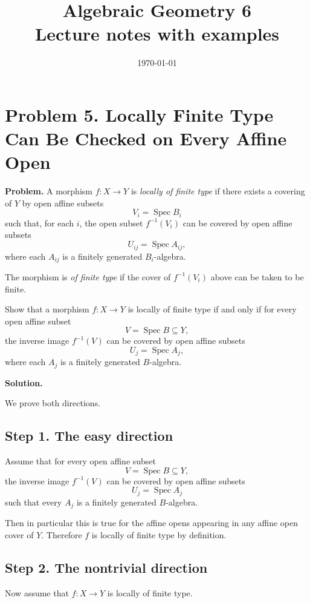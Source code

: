 \documentclass[12pt,a4paper]{article}
\title{\bfseries Algebraic Geometry 6\\


\large Lecture notes with examples}
\author{}
\date{\today}
\theoremstyle{notespace}
\begin{document}
\maketitle
\tableofcontents
\clearpage

\section{Problem 5. Locally Finite Type Can Be Checked on Every Affine Open}

\textbf{Problem.}
A morphism \(f:X\to Y\) is \emph{locally of finite type} if there exists a covering of \(Y\) by open affine subsets
\[
V_i=\operatorname{Spec}B_i
\]
such that, for each \(i\), the open subset \(f^{-1}(V_i)\) can be covered by open affine subsets
\[
U_{ij}=\operatorname{Spec}A_{ij},
\]
where each \(A_{ij}\) is a finitely generated \(B_i\)-algebra.

The morphism is \emph{of finite type} if the cover of \(f^{-1}(V_i)\) above can be taken to be finite.

Show that a morphism \(f:X\to Y\) is locally of finite type if and only if for every open affine subset
\[
V=\operatorname{Spec}B\subseteq Y,
\]
the inverse image \(f^{-1}(V)\) can be covered by open affine subsets
\[
U_j=\operatorname{Spec}A_j,
\]
where each \(A_j\) is a finitely generated \(B\)-algebra.

\textbf{Solution.}

We prove both directions.

\subsection*{Step 1. The easy direction}

Assume that for every open affine subset
\[
V=\operatorname{Spec}B\subseteq Y,
\]
the inverse image \(f^{-1}(V)\) can be covered by open affine subsets
\[
U_j=\operatorname{Spec}A_j
\]
such that every \(A_j\) is a finitely generated \(B\)-algebra.

Then in particular this is true for the affine opens appearing in any affine open cover of \(Y\). Therefore \(f\) is locally of finite type by definition.

\subsection*{Step 2. The nontrivial direction}

Now assume that \(f:X\to Y\) is locally of finite type.
\end{document}
